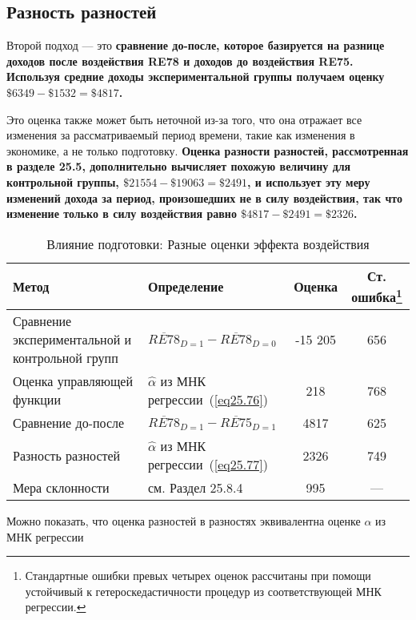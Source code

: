 \subsection{Разность разностей}

Второй подход --- это \bfseries сравнение до-после, \mdseries которое базируется на разнице доходов после воздействия RE78 и доходов до воздействия RE75. Используя средние доходы экспериментальной группы получаем оценку $\$ 6 349 - \$ 1 532 = \$ 4 817$. 

Это оценка также может быть неточной из-за того, что она отражает все изменения за рассматриваемый период времени, такие как изменения в экономике, а не только подготовку. \bfseries Оценка разности разностей, \mdseries  рассмотренная в разделе 25.5, дополнительно вычисляет похожую величину для контрольной группы, $\$ 21 554 - \$ 19 063 = \$ 2 491$, и использует эту меру изменений дохода за период, произошедших не в силу воздействия, так что изменение только в силу воздействия равно $\$ 4 817 - \$ 2 491 = \$ 2 326$. 

\begin{table}[h]
\caption{\label{} Влияние подготовки: Разные оценки эффекта воздействия}
\begin{minipage}{17.5cm}
\begin{center}
\begin{tabular}{p{7cm}lcc}
\hline
\hline
Метод & Определение & Оценка &  Ст. ошибка\footnote{Стандартные ошибки превых четырех оценок рассчитаны при помощи устойчивый к гетероскедастичности процедур из соответствующей МНК регрессии.} \\
\hline
Сравнение экспериментальной и контрольной групп & $\overline{RE78}_{D=1} - \overline{RE78}_{D=0} $ & -15 205 & 656 \\
Оценка управляющей функции & $\widehat{\alpha}$ из МНК регрессии~(\ref{eq25.76}) & 218 & 768\\
Сравнение до-после & $\overline{RE78}_{D=1} - \overline{RE75}_{D=1} $ & 4817 & 625 \\
Разность разностей & $\widehat{\alpha}$ из МНК регрессии~(\ref{eq25.77}) & 2326 & 749 \\
Мера склонности & см. Раздел 25.8.4 & 995 & --- \\
\hline
\hline
\end{tabular}
\end{center}
\end{minipage}
\end{table}

Можно показать, что оценка разностей в разностях эквивалентна оценке $\alpha$ из МНК регрессии

